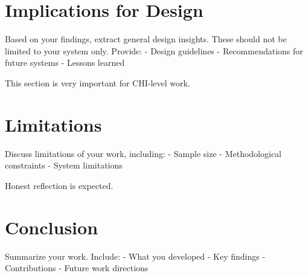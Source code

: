 \documentclass[sigconf]{acmart}
\begin{document}
\section{Implications for Design}

Based on your findings, extract general design insights. These should not be limited to your system only. Provide:
- Design guidelines
- Recommendations for future systems
- Lessons learned

This section is very important for CHI-level work.

\section{Limitations}

Discuss limitations of your work, including:
- Sample size
- Methodological constraints
- System limitations

Honest reflection is expected.

\section{Conclusion}

Summarize your work. Include:
- What you developed
- Key findings
- Contributions
- Future work directions



\end{document}
